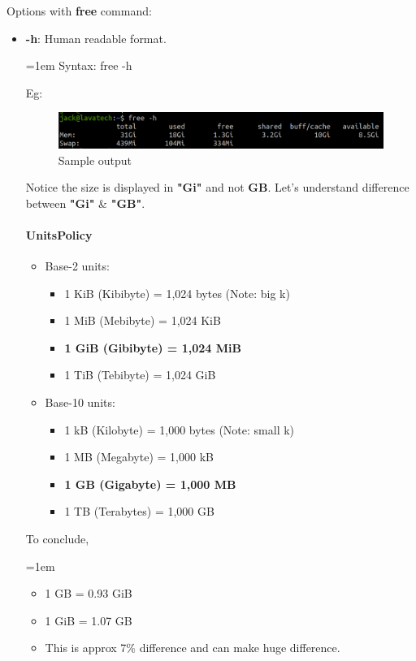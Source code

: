 \begin{flushleft}
\begin{itemize}
	Options with \textbf{free} command:
	\begin{itemize}
		\item \textbf{-h}: Human readable format.
		\bigskip
		\begin{tcolorbox}[breakable,notitle,boxrule=-0pt,colback=pink,colframe=pink]
			\color{black}
			\font=1em
			Syntax: free -h
			\font=4pt
		\end{tcolorbox}
		Eg:
		\begin{figure}[h!]
			\centering
			\includegraphics[scale=.3]{content/chapter12/images/free_h.png}
			\caption{Sample output}
			\label{fig:free_h}
		\end{figure}

	Notice the size is displayed in \textbf{"Gi"} and not \textbf{GB}. Let's understand difference between \textbf{"Gi"} \& \textbf{"GB"}.
	
	\paragraph{UnitsPolicy}
	\begin{itemize}
		\item Base-2 units:
		\begin{itemize}
			\item 1 KiB (Kibibyte) = 1,024 bytes (Note: big k)
			\item 1 MiB (Mebibyte) = 1,024 KiB
			\item \textbf{1 GiB (Gibibyte) = 1,024 MiB}
			\item 1 TiB (Tebibyte) = 1,024 GiB
		\end{itemize}
		\bigskip
		\item Base-10 units:
		\begin{itemize}
			\item 1 kB (Kilobyte) = 1,000 bytes (Note: small k)
			\item 1 MB (Megabyte) = 1,000 kB
			\item \textbf{1 GB (Gigabyte) = 1,000 MB}
			\item 1 TB (Terabytes) = 1,000 GB
		\end{itemize}
	\end{itemize}

	To conclude,
	\bigskip
	\begin{tcolorbox}[breakable,notitle,boxrule=-0pt,colback=pink,colframe=pink]
		\color{black}
		\font=1em
		\begin{itemize}
			\item 1 GB = 0.93 GiB
			\item 1 GiB = 1.07 GB
			\item This is approx 7\% difference and can make huge difference.
		\end{itemize}	
		\font=4pt
	\end{tcolorbox}


\end{itemize}
\end{itemize}
\end{flushleft}
